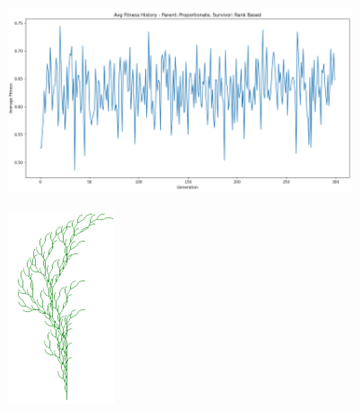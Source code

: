\begin{figure}[H]
    \centering
    \begin{subfigure}[b]{0.3\textwidth}
        \includegraphics[width=\textwidth]{image2.png}
    \end{subfigure}
    \begin{subfigure}[b]{0.1\textwidth}
        \includegraphics[width=\textwidth]{img2.png}

\end{subfigure}
\end{figure}
